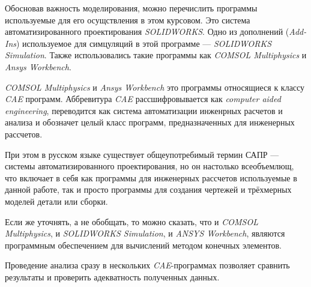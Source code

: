 Обосновав важность моделирования,
можно перечислить программы используемые для его осущствления в этом курсовом.
Это система автоматизированного проектирования \textit{SOLIDWORKS}.
Одно из дополнений (\textit{Add-Ins}) используемое для симцуляций в этой программе — \textit{SOLIDWORKS Simulation}.
Также использовались такие программы как \textit{COMSOL Multiphysics} и \textit{Ansys Workbench}.

\textit{COMSOL Multiphysics} и \textit{Ansys Workbench} это программы относящиеся к классу \textit{CAE} программ.
Аббревитура \textit{CAE} рассшифровывается как \textit{computer aided engineering},
переводится как система автоматизации инженрных расчетов и анализа и обозначет целый класс программ,
предназначенных для инженерных рассчетов.

При этом в русском языке существует общеупотребимый термин САПР — системы автоматизированного проектирования,
но он настолько всеобъемлющ, что включает в себя как программы для инженерных рассчетов используемые в данной работе,
так и просто программы для создания чертежей и трёхмерных моделей детали или сборки.

Если же уточнять, а не обобщать, то можно сказать,
что и \textit{COMSOL Multiphysics}, и \textit{SOLIDWORKS Simulation},  и \textit{ANSYS Workbench},
являются программным обеспечением для вычислений методом конечных элементов.

Проведение анализа сразу в нескольких \textit{CAE}-программах позволяет сравнить результаты и проверить адекватность полученных данных.